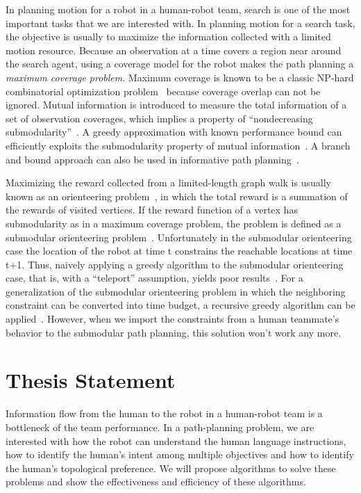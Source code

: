 \documentclass[phd]{byuprop}
\begin{document}
In planning motion for a robot in a human-robot team, search is one of the most important tasks that we are interested with.
In planning motion for a search task, the objective is usually to maximize the information collected with a limited motion resource.
Because an observation at a time covers a region near around the search agent, using a coverage model for the robot makes the path planning a {\em maximum coverage problem}.
Maximum coverage is known to be a classic NP-hard combinatorial optimization problem~\cite{Megiddo1983} because coverage overlap can not be ignored. 
Mutual information is introduced to measure the total information
of a set of observation coverages, which implies a property of
“nondecreasing submodularity”~\cite{Singh2009}. 
A greedy approximation with known performance bound can efficiently exploits the submodularity property of mutual information~\cite{Singh2009}. 
A branch and bound approach can also be used in informative path
planning~\cite{Binney2012}.

Maximizing the reward collected from a limited-length graph walk is usually known as an orienteering problem~\cite{Vansteenwegen2011}, in which the total reward is a summation of the rewards of visited vertices. 
If the reward function of a vertex has submodularity as in a maximum coverage problem, the problem is defined as a submodular orienteering problem~\cite{Chekuri2005}. 
Unfortunately in the submodular orienteering case the location of the robot at time t constrains the reachable locations at time t+1.
Thus, naively applying a greedy algorithm to the submodular orienteering case, that is, with a “teleport” assumption, yields poor results~\cite{Krause2012}. 
For a generalization of the submodular orienteering problem in which the neighboring constraint can be converted into time budget, a recursive greedy algorithm can be applied~\cite{Chekuri2005}.
However, when we import the constraints from a human teammate's behavior to the submodular path planning, this solution won't work any more. 


\section{Thesis Statement}

Information flow from the human to the robot in a human-robot team is a bottleneck of the team performance.
In a path-planning problem, we are interested with how the robot can understand the human language instructions, how to identify the human's intent among multiple objectives and how to identify the human's topological preference.
We will propose algorithms to solve these problems and show the effectiveness and efficiency of these algorithms.
\end{document}

